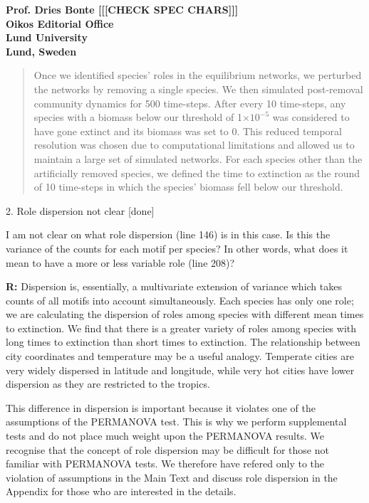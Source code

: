 \documentclass[12pt]{letter}
\begin{document}
\begin{letter}{\bf Prof. Dries Bonte [[[CHECK SPEC CHARS]]]\\
Oikos Editorial Office \\
Lund University \\
Lund, Sweden}
    \begin{quotation}

            Once we identified species' roles in the equilibrium networks, we perturbed the networks by removing a single species. 
            We then simulated post-removal community dynamics for 500 time-steps.
            After every 10 time-steps, any species with a biomass below our threshold of 1$\times10^{-5}$ was considered to have gone extinct and its biomass was set to 0.
            This reduced temporal resolution was chosen due to computational limitations and allowed us to maintain a large set of simulated networks.
            For each species other than the artificially removed species, we defined the time to extinction as the round of 10 time-steps in which the species' biomass fell below our threshold. 

    \end{quotation}


    2. Role dispersion not clear [done]


        I am not clear on what role dispersion (line 146) is in this case. Is this the variance of the counts for each motif per species? In other words, what does it mean to have a more or less variable role (line 208)?
        
        \textbf{R:} Dispersion is, essentially, a multivariate extension of variance which takes counts of all motifs into account simultaneously. 
        Each species has only one role; we are calculating the dispersion of roles among species with different mean times to extinction. 
        We find that there is a greater variety of roles among species with long times to extinction than short times to extinction.
        The relationship between city coordinates and temperature may be a useful analogy. 
        Temperate cities are very widely dispersed in latitude and longitude, while very hot cities have lower dispersion as they are restricted to the tropics.
        
        
        This difference in dispersion is important because it violates one of the assumptions of the PERMANOVA test.
        This is why we perform supplemental tests and do not place much weight upon the PERMANOVA results.
        We recognise that the concept of role dispersion may be difficult for those not familiar with PERMANOVA tests.
        We therefore have refered only to the violation of assumptions in the Main Text and discuss role dispersion in the Appendix for those who are interested in the details.



\end{letter}
\end{document}
